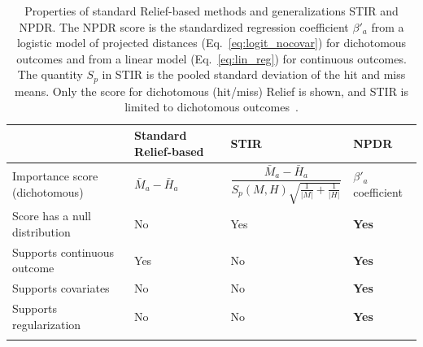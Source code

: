 \documentclass{bioinfo}
\begin{document}
\begin{table}[h]
\centering
\begin{tabular}{p{4.5cm}p{3cm}p{3.5cm}p{2.5cm}}
                           & Standard Relief-based & STIR    & NPDR \\
\hline
Importance score (dichotomous)  & $\bar{M}_a - \bar{H}_a$  & $\dfrac{\bar{M}_a - \bar{H}_a }{S_p(M,H)\sqrt{\frac{1}{|M|}+\frac{1}{|H|}}}$ &  $\beta'_a$ coefficient \\
Score has a null distribution & No                               & Yes     & {\bf Yes}  \\
Supports continuous outcome   & Yes                              & No      & {\bf Yes}  \\
Supports covariates           & No                               & No      & {\bf Yes} \\
Supports regularization           & No                               & No      & {\bf Yes} \\
\hline\\
\end{tabular}
\caption{Properties of standard Relief-based methods and generalizations STIR and NPDR. The NPDR score is the standardized regression coefficient $\beta'_a$ from a logistic model of projected distances (Eq.~\ref{eq:logit_nocovar}) for dichotomous outcomes and from a linear model (Eq.~\ref{eq:lin_reg}) for continuous outcomes. The quantity $S_p$ in STIR is the pooled standard deviation of the hit and miss means. Only the score for dichotomous (hit/miss) Relief is shown, and STIR is limited to dichotomous outcomes~\citep{stir}.}
\label{tab:compare_npdr}
\end{table}


% 
\end{document}
